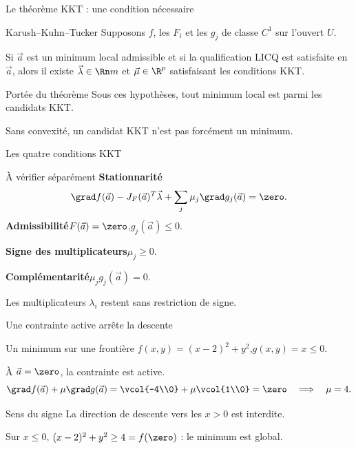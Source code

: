 \begin{frame}[t]{Le théorème KKT : une condition nécessaire}
\coursanalyse
\begin{theoreme}{Karush–Kuhn–Tucker}
Supposons $f$, les $F_i$ et les $g_j$ de classe $C^1$ sur l’ouvert $U$.
\medskip\par Si $\vec a$ est un minimum local admissible et si la qualification LICQ est satisfaite en $\vec a$, alors il existe $\vec\lambda\in\Rn m$ et $\vec\mu\in\R^p$ satisfaisant les conditions KKT.
\end{theoreme}
\begin{resultat}{Portée du théorème}
Sous ces hypothèses, tout minimum local est parmi les candidats KKT.
\end{resultat}\vfill Sans convexité, un candidat KKT n’est pas forcément un minimum.
\end{frame}

\begin{frame}[t]{Les quatre conditions KKT}
\coursanalyse
\begin{cours}{À vérifier séparément}
\textbf{Stationnarité}
\[\grad f(\vec a)-J_F(\vec a)^T\vec\lambda+\sum_j\mu_j\grad g_j(\vec a)=\zero.\]
\textbf{Admissibilité}\quad $F(\vec a)=\zero$,\quad $g_j(\vec a)\le0$.
\medskip\par\textbf{Signe des multiplicateurs}\quad $\mu_j\ge0$.
\medskip\par\textbf{Complémentarité}\quad $\mu_jg_j(\vec a)=0$.
\end{cours}\vfill Les multiplicateurs $\lambda_i$ restent sans restriction de signe.
\end{frame}

\begin{frame}[t]{Une contrainte active arrête la descente}
\coursanalyse
\begin{exemple}{Un minimum sur une frontière}
$f(x,y)=(x-2)^2+y^2$,\quad $g(x,y)=x\le0$.
\par À $\vec a=\zero$, la contrainte est active.
\[\grad f(\vec a)+\mu\grad g(\vec a)=\vcol{-4\\0}+\mu\vcol{1\\0}=\zero\quad\Longrightarrow\quad\mu=4.\]
\end{exemple}
\begin{resultat}{Sens du signe}
La direction de descente vers les $x>0$ est interdite.
\par Sur $x\le0$, $(x-2)^2+y^2\ge4=f(\zero)$ : le minimum est global.
\end{resultat}
\end{frame}

